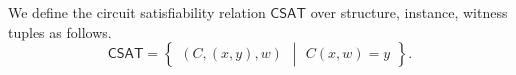 \begin{definition}
    We define the circuit satisfiability relation $\mathsf{CSAT}$
    over structure, instance, witness tuples
    as follows.
    \begin{equation*}
      \mathsf{CSAT}
      = 
      \left\{
      \begin{array}{l}
          (C, (x, y), w)
      \end{array}
      \middle\vert
      \begin{array}{l}
          C(x, w) = y
      \end{array}
      \right\}.
    \end{equation*}  
  \end{definition}